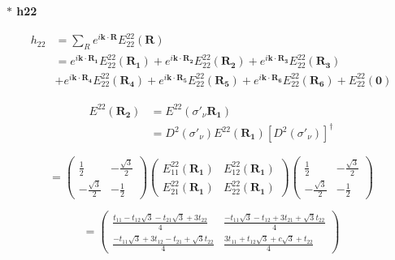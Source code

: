 \documentclass{report}
\begin{document}
\noindent\textbf{ $\ast$ h22}

\begin{align*}
	h_{22} & = \sum_{R}^{} e^{i\mathbf{k\cdot R}} E^{22}_{22}(\textbf{R})                                                                                                                                \\
	       & =  e^{i\mathbf{k\cdot R_1}} E^{22}_{22}(\mathbf{R_1}) +  e^{i\mathbf{k\cdot R_2}} E^{22}_{22}(\mathbf{R_2}) +  e^{i\mathbf{k\cdot R_3}} E^{22}_{22}(\mathbf{R_3})                           \\
	       & +  e^{i\mathbf{k\cdot R_4}} E^{22}_{22}(\mathbf{R_4}) +  e^{i\mathbf{k\cdot R_5}} E^{22}_{22}(\mathbf{R_5}) +  e^{i\mathbf{k\cdot R_6}} E^{22}_{22}(\mathbf{R_6}) + E^{22}_{22}(\mathbf{0})
\end{align*}

\begin{align*}
	E^{22} (\mathbf{R_2})
	 & =  E^{22} (\sigma'_\nu \mathbf{R_1})                                             \\
	 & = D^2(\sigma'_\nu)  E^{22}(\mathbf{R_1}) \left[ D^2(\sigma'_\nu) \right]^\dagger
\end{align*}

\[
	\renewcommand{\arraystretch}{0.75}
	=
	\begin{pmatrix}
		\frac{1}{2}         & -\frac{\sqrt{3}}{2} \\
		-\frac{\sqrt{3}}{2} & -\frac{1}{2}
	\end{pmatrix}
	\begin{pmatrix}
		E_{11}^{22}(\mathbf{R_1}) & E_{12}^{22}(\mathbf{R_1}) \\
		E_{21}^{22}(\mathbf{R_1}) & E_{22}^{22}(\mathbf{R_1})
	\end{pmatrix}
	\begin{pmatrix}
		\frac{1}{2}         & -\frac{\sqrt{3}}{2} \\
		-\frac{\sqrt{3}}{2} & -\frac{1}{2}
	\end{pmatrix}
\]

\[
	\renewcommand{\arraystretch}{0.75}
	=
	\begin{pmatrix}
		\frac{t_{11} - t_{12}\sqrt{3} -t_{21}\sqrt{3} + 3t_{22}}{4}   & \frac{-t_{11}\sqrt{3} - t_{12} + 3t_{21} + \sqrt{3}t_{22}}{4} \\
		\frac{-t_{11}\sqrt{3} + 3t_{12} - t_{21} + \sqrt{3}t_{22}}{4} & \frac{3t_{11} + t_{12}\sqrt{3} + c\sqrt{3} + t_{22}}{4}
	\end{pmatrix}
\]
\end{document}
